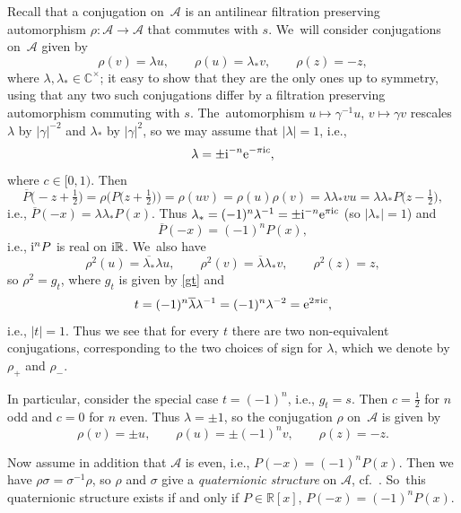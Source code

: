 \documentclass[10pt,a4paper]{amsart}
\newcommand{\RN}{\mathbb{R}} %
\newcommand{\ovl}{\overline}
\newcommand{\mc}[1]{\mathcal{#1}}
\theoremstyle{definition}
\numberwithin{equation}{section}
\begin{document}
Recall \cite[Section~3.6]{ES} that a conjugation on~$\mc A$ is an antilinear filtration preserving automorphism $\rho\colon \mc A\to \mc A$ that commutes with $s$. We~will consider conjugations on~$\mc A$
given by
\begin{equation}\label{rho}
\rho(v)=\lambda u,\qquad \rho(u)=\lambda_* v,\qquad \rho(z)=-z,
\end{equation}
where $\lambda,\lambda_*\in \mathbb C^\times$; it easy to show that they are the only ones up to symmetry, using that any two such conjugations differ by a filtration preserving automorphism commuting with $s$. The~auto\-morphism $u\mapsto \gamma^{-1} u$, $v\mapsto \gamma v$ rescales $\lambda$ by $|\gamma|^{-2}$ and $\lambda_*$ by $|\gamma|^2$, so we may assume that $|\lambda|=1$, i.e.,
\[
\lambda=\pm {\rm i}^{-n}{\rm e}^{-\pi {\rm i} c},
\]
where $c\in [0,1)$.
Then
\[
\overline{P}\big({-}z+\tfrac{1}{2}\big)=\rho\big(P\big(z+\tfrac{1}{2}\big)\big)
=\rho(uv)=\rho(u)\rho(v)=\lambda\lambda_* vu=\lambda\lambda_* P\big(z-\tfrac{1}{2}\big),
\]
i.e., $\overline{P}(-x)=\lambda\lambda_* P(x)$. Thus $\lambda_*=(-1)^n\lambda^{-1}=\pm {\rm i}^{-n}{\rm e}^{\pi {\rm i}c}$ (so $|\lambda_*|=1$) and
\[
\ovl{P}(-x)=(-1)^n P(x),
\]
i.e., ${\rm i}^nP$ is real on ${\rm i}\mathbb R$. We~also have
\[
\rho^2(u)=\overline{\lambda_*}\lambda u,\qquad \rho^2(v)=\overline{\lambda}\lambda_* v,\qquad \rho^2(z)=z,
\]
so $\rho^2=g_t$, where $g_t$ is given by \eqref{gt} and
\[
t=(-1)^n\overline{\lambda}\lambda^{-1}=(-1)^n\lambda^{-2}={\rm e}^{2\pi {\rm i}c},
\]
i.e., $|t|=1$. Thus we see that for every $t$ there are two non-equivalent conjugations, corresponding to the two choices of sign for $\lambda$, which we denote by $\rho_+$ and $\rho_-$.

In particular, consider the special case $t=(-1)^n$, i.e., $g_t=s$. Then $c=\frac{1}{2}$ for $n$ odd and $c=0$ for $n$ even.
Thus $\lambda=\pm 1$, so the conjugation $\rho$ on~$\mc A$ is given by
\[
\rho(v)=\pm u,\qquad \rho(u)=\pm (-1)^nv,\qquad \rho(z)=-z.
\]

Now assume in addition that $\mc A$ is even, i.e., $P(-x)=(-1)^nP(x)$. Then we have $\rho\sigma=\sigma^{-1}\rho$, so $\rho$ and $\sigma$ give a {\it quaternionic structure} on $\mc{A}$, cf.~\cite[Section~3.7]{ES}. So~this quaternionic structure exists if and only if $P\in \RN[x]$, $P(-x)=(-1)^n P(x)$.
\end{document}
